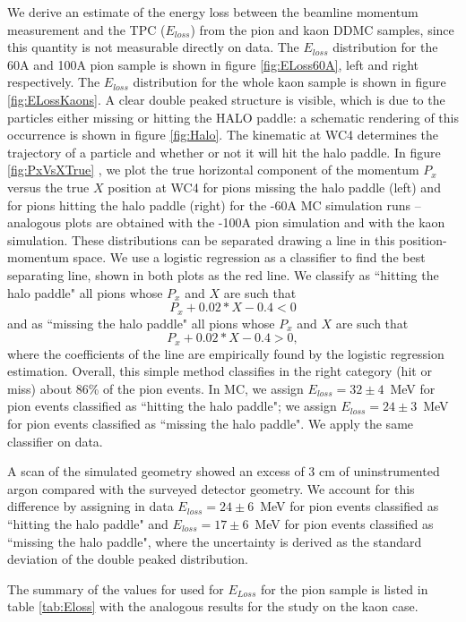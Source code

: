 We derive an estimate of the energy loss between the beamline momentum measurement and the TPC ($E_{loss}$) from the pion and kaon DDMC samples, since this quantity is not  measurable directly on data. 
The $E_{loss}$ distribution for the 60A  and 100A pion sample is shown in figure \ref{fig:ELoss60A}, left and right respectively. The $E_{loss}$ distribution for the  whole kaon sample is shown in figure \ref{fig:ELossKaons}. A clear double peaked structure is visible, which is due to the particles either missing or hitting the HALO paddle: a schematic rendering of this occurrence is  shown in figure \ref{fig:Halo}. The kinematic at WC4 determines the trajectory of a particle and whether or not it will hit the halo paddle. In figure \ref{fig:PxVsXTrue} , we plot the true  horizontal component of the momentum $P_x$ versus the true $X$ position at WC4 for pions missing the halo paddle (left) and for pions hitting the halo paddle (right) for the -60A MC simulation runs -- analogous plots are obtained with the -100A pion simulation and with the kaon simulation. These distributions can be separated drawing a line in this position-momentum space. 
We use a logistic regression  \cite{agresti2013categorical}  as a classifier to find the best separating line, shown in both plots as the red line. We classify as ``hitting the halo paddle" all pions whose $P_x$ and $X$ are such that $$P_x +0.02* X - 0.4 < 0 $$ and as ``missing the halo  paddle" all pions whose $P_x$ and $X$ are such that $$P_x +0.02*X - 0.4 > 0, $$ where the coefficients of the line are empirically found by the logistic regression estimation. Overall, this simple method classifies in the right category (hit or miss) about 86\% of the pion events. In MC, we assign  $E_{loss} = 32 \pm 4 $~MeV for pion events classified as ``hitting the halo paddle"; we assign  $E_{loss} = 24 \pm 3 $~MeV for pion events classified as ``missing the halo paddle". We apply the same classifier on data. 

A scan of the simulated geometry showed an excess of 3 cm of uninstrumented argon compared with the surveyed detector geometry. We account for this difference by assigning in data $E_{loss} = 24 \pm 6 $~MeV for pion events classified as ``hitting the halo paddle" and  $E_{loss} = 17 \pm 6 $~MeV for pion events classified as ``missing the halo paddle", where the uncertainty is derived as the standard deviation of the double peaked distribution.

The summary of the values for used for $E_{Loss}$ for the pion sample is listed in table \ref{tab:Eloss}  with the analogous results for the study on the kaon case.

